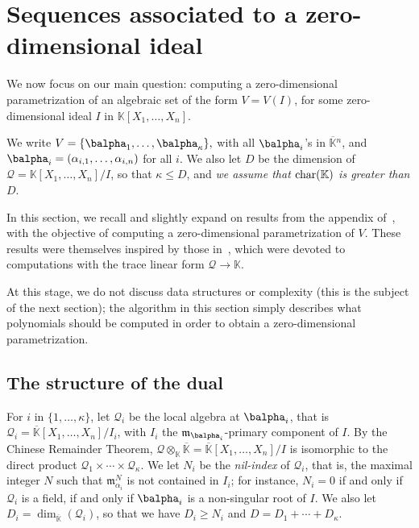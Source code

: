 \documentclass[12pt]{article}
\newcommand{\residueI}{\mathscr{Q}}
\def\dg{\kappa}
\def\K{\mathbb{K}}
\def\K {\ensuremath{\mathbb{K}}}
\def\Kbar {{\ensuremath{\overline{\mathbb{K}}}}}
\def\D {\ensuremath{D}}
\def\m {\ensuremath{\mathfrak{m}}}
\begin{document}

\section{Sequences associated to a zero-dimensional ideal}\label{sec:seq0}

We now focus on our main question: computing a zero-dimensional
parametrization of an algebraic set of the form $V=V(I)$, for some
zero-dimensional ideal $I$ in $\K[X_1,\dots,X_n]$. 

We write $V=\{\balpha_1,\dots,\balpha_\dg\},$ with all $\balpha_i$'s
in $\Kbar{}^n$, and $\balpha_i=(\alpha_{i,1},\dots,\alpha_{i,n})$ for
all $i$.  We also let $\D$ be the dimension of
$\residueI=\K[X_1,\dots,X_n]/I$, so that $\dg \le \D$, and {\em we
  assume that ${\rm char}(\K)$ is greater than $D$}.

In this section, we recall and slightly expand on results from the appendix
of~\cite{BoSaSc03}, with the objective of computing a zero-dimensional
parametrization of $V$. These results were themselves inspired by 
those in~\cite{Rouillier99}, which were devoted to computations
with the trace linear form $\residueI\to\K$.

At this stage, we do not discuss data structures or complexity (this
is the subject of the next section); the algorithm in this
section simply describes what polynomials should be computed in order
to obtain a zero-dimensional parametrization.


\subsection{The structure of the dual}\label{ssec:dual}

For $i$ in $\{1,\dots,\dg\}$, let $\residueI_i$ be the local algebra at
$\balpha_i$, that is $\residueI_i=\Kbar[X_1,\dots,X_n]/I_i$, with $I_i$ the
$\m_{\balpha_i}$-primary component of $I$. By the Chinese Remainder
Theorem, $\residueI\otimes_\K \Kbar=\Kbar[X_1,\dots,X_n]/I$ is isomorphic to
the direct product $\residueI_1\times \cdots \times \residueI_\dg$.  We let $N_i$ be the
{\em nil-index} of $\residueI_i$, that is, the maximal integer $N$ such that
$\m_{\alpha_i}^N$ is not contained in $I_i$; for instance, $N_i=0$ if
and only if $\residueI_i$ is a field, if and only if $\balpha_i$ is a
non-singular root of $I$. We also let $\D_i=\dim_\Kbar(\residueI_i)$, so that
we have $D_i \ge N_i$ and $\D=\D_1 + \cdots + \D_\dg$.
\end{document}
